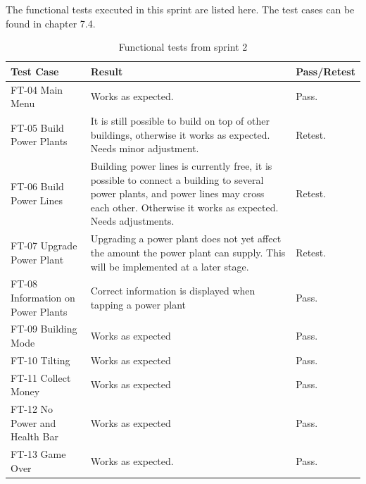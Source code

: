 	The functional tests executed in this sprint are listed here. The test cases can be found in chapter 7.4.


	\begin{table}
	\begin{tabular}{| p{3cm} | p{6.5cm} | p{2.5cm} |}
		\hline
		\rowcolor{lightgray}
		{\bf Test Case} & {\bf Result} & {\bf Pass/Retest} \\ \hline
	  	
	  	FT-04 Main Menu & Works as expected. & Pass. \\ \hline

		FT-05 Build Power Plants & It is still possible to build on top of other buildings, otherwise it works as expected. Needs minor adjustment. &  Retest. \\ \hline

		FT-06 Build Power Lines & Building power lines is currently free, it is possible to connect a building to several power plants, and power lines may cross each other. Otherwise it works as expected. Needs adjustments.  & Retest. \\ \hline

		FT-07 Upgrade Power Plant & Upgrading a power plant does not yet affect the amount the power plant can supply. This will be implemented at a later stage. & Retest. \\ \hline

		FT-08 Information on Power Plants & Correct information is displayed when tapping a power plant & Pass.\\ \hline

		FT-09 Building Mode & Works as expected & Pass. \\ \hline

		FT-10 Tilting & Works as expected & Pass. \\ \hline

		FT-11 Collect Money & Works as expected & Pass. \\ \hline

		FT-12 No Power and Health Bar & Works as expected & Pass. \\ \hline

		FT-13 Game Over & Works as expected. & Pass. \\ \hline

	\end{tabular}
	\caption{Functional tests from sprint 2}
	\end{table}

